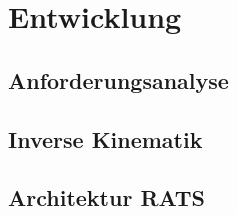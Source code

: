 \section{Entwicklung}
\label{sec:entwicklung}

\subsection{Anforderungsanalyse}
\subsection{Inverse Kinematik}
\subsection{Architektur RATS}
